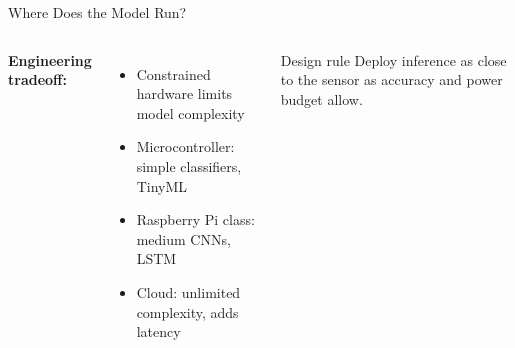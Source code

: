 \documentclass[aspectratio=169,11pt]{beamer}
\begin{document}
\begin{frame}[shrink]{Where Does the Model Run?}
\begin{columns}
        \textbf{Engineering tradeoff:}
        \begin{itemize}\setlength{\itemsep}{0pt}
            \item Constrained hardware limits model complexity
            \item Microcontroller: simple classifiers, TinyML
            \item Raspberry Pi class: medium CNNs, LSTM
            \item Cloud: unlimited complexity, adds latency
        \end{itemize}
        \vspace{0.05cm}
        \begin{exampleblock}{Design rule}
            Deploy inference as close to the sensor as accuracy and power budget allow.
        \end{exampleblock}
    \end{columns}
\end{frame}
\end{document}

